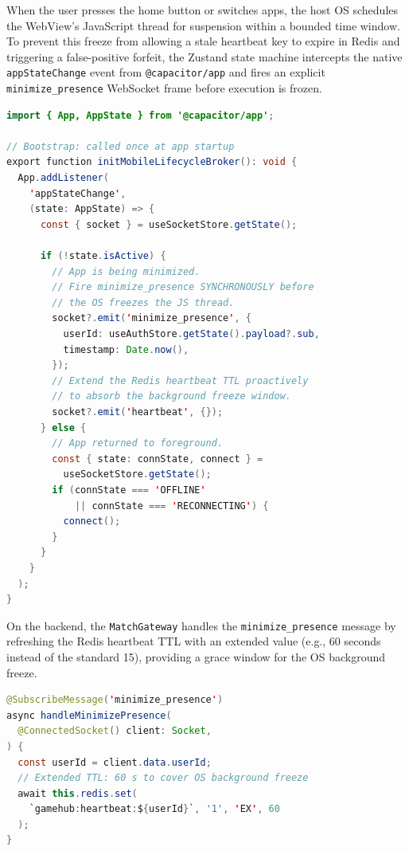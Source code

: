 \documentclass[11pt,a4paper]{report}
\begin{document}
When the user presses the home button or switches apps, the host OS schedules the WebView's JavaScript thread for suspension within a bounded time window. To prevent this freeze from allowing a stale heartbeat key to expire in Redis and triggering a false-positive forfeit, the Zustand state machine intercepts the native \texttt{appStateChange} event from \texttt{@capacitor/app} and fires an explicit \texttt{minimize\_presence} WebSocket frame before execution is frozen.

\begin{lstlisting}[language=Java, caption={Capacitor app lifecycle interceptor in Zustand}]
import { App, AppState } from '@capacitor/app';

// Bootstrap: called once at app startup
export function initMobileLifecycleBroker(): void {
  App.addListener(
    'appStateChange',
    (state: AppState) => {
      const { socket } = useSocketStore.getState();

      if (!state.isActive) {
        // App is being minimized.
        // Fire minimize_presence SYNCHRONOUSLY before
        // the OS freezes the JS thread.
        socket?.emit('minimize_presence', {
          userId: useAuthStore.getState().payload?.sub,
          timestamp: Date.now(),
        });
        // Extend the Redis heartbeat TTL proactively
        // to absorb the background freeze window.
        socket?.emit('heartbeat', {});
      } else {
        // App returned to foreground.
        const { state: connState, connect } =
          useSocketStore.getState();
        if (connState === 'OFFLINE'
            || connState === 'RECONNECTING') {
          connect();
        }
      }
    }
  );
}
\end{lstlisting}

On the backend, the \texttt{MatchGateway} handles the \texttt{minimize\_presence} message by refreshing the Redis heartbeat TTL with an extended value (e.g., 60 seconds instead of the standard 15), providing a grace window for the OS background freeze.

\begin{lstlisting}[language=Java, caption={Backend minimize\_presence handler in MatchGateway}]
@SubscribeMessage('minimize_presence')
async handleMinimizePresence(
  @ConnectedSocket() client: Socket,
) {
  const userId = client.data.userId;
  // Extended TTL: 60 s to cover OS background freeze
  await this.redis.set(
    `gamehub:heartbeat:${userId}`, '1', 'EX', 60
  );
}
\end{lstlisting}
\end{document}
